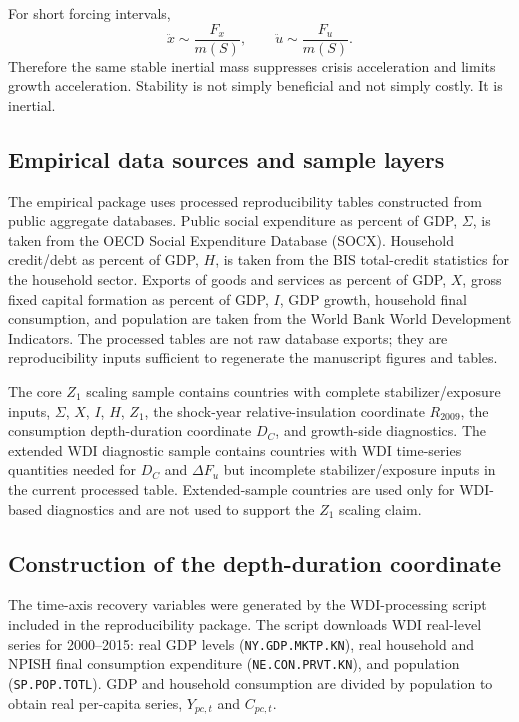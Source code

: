 \documentclass[11pt]{article}
\begin{document}
For short forcing intervals,
\[
\ddot{x}\sim \frac{F_x}{m(S)},\qquad \ddot{u}\sim \frac{F_u}{m(S)}.
\]
Therefore the same stable inertial mass suppresses crisis acceleration and limits growth acceleration. Stability is not simply beneficial and not simply costly. It is inertial.


\subsection{Empirical data sources and sample layers}
The empirical package uses processed reproducibility tables constructed from public aggregate databases. Public social expenditure as percent of GDP, $\Sigma$, is taken from the OECD Social Expenditure Database (SOCX). Household credit/debt as percent of GDP, $H$, is taken from the BIS total-credit statistics for the household sector. Exports of goods and services as percent of GDP, $X$, gross fixed capital formation as percent of GDP, $I$, GDP growth, household final consumption, and population are taken from the World Bank World Development Indicators. The processed tables are not raw database exports; they are reproducibility inputs sufficient to regenerate the manuscript figures and tables.

The core $Z_1$ scaling sample contains countries with complete stabilizer/exposure inputs, $\Sigma$, $X$, $I$, $H$, $Z_1$, the shock-year relative-insulation coordinate $R_{2009}$, the consumption depth-duration coordinate $D_C$, and growth-side diagnostics. The extended WDI diagnostic sample contains countries with WDI time-series quantities needed for $D_C$ and $\Delta F_u$ but incomplete stabilizer/exposure inputs in the current processed table. Extended-sample countries are used only for WDI-based diagnostics and are not used to support the $Z_1$ scaling claim.

\subsection{Construction of the depth-duration coordinate}
The time-axis recovery variables were generated by the WDI-processing script included in the reproducibility package. The script downloads WDI real-level series for 2000--2015: real GDP levels (\texttt{NY.GDP.MKTP.KN}), real household and NPISH final consumption expenditure (\texttt{NE.CON.PRVT.KN}), and population (\texttt{SP.POP.TOTL}). GDP and household consumption are divided by population to obtain real per-capita series, $Y_{pc,t}$ and $C_{pc,t}$.
\end{document}
